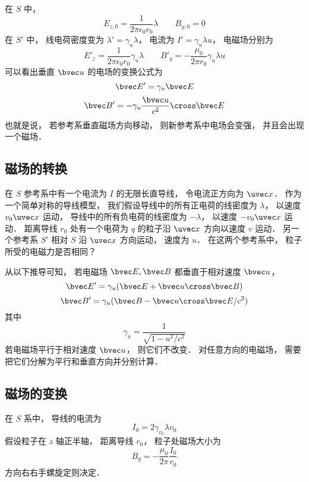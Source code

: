 在 $S$ 中，
\begin{equation}
E_{z,0} = \frac{1}{2\pi\epsilon_0 r_0} \lambda
\qquad
B_{y,0} = 0
\end{equation}
在 $S'$ 中， 线电荷密度变为 $\lambda' = \gamma_u \lambda$， 电流为 $I' = \gamma_u \lambda u$， 电磁场分别为
\begin{equation}
E'_z = \frac{1}{2\pi\epsilon_0 r_0} \gamma_u \lambda
\qquad
B'_y = -\frac{\mu_0}{2\pi r_0}\gamma_u \lambda u
\end{equation}
可以看出垂直 $\bvec u$ 的电场的变换公式为
\begin{equation}\label{EMRef_eq5}
\bvec E' = \gamma_u \bvec E
\end{equation}
\begin{equation}\label{EMRef_eq6}
\bvec B' = -\gamma_u \frac{\bvec u}{c^2} \cross \bvec E
\end{equation}
也就是说， 若参考系垂直磁场方向移动， 则新参考系中电场会变强， 并且会出现一个磁场．

\subsection{磁场的转换}
在 $S$ 参考系中有一个电流为 $I$ 的无限长直导线， 令电流正方向为 $\uvec x$． 作为一个简单对称的导线模型， 我们假设导线中的所有正电荷的线密度为 $\lambda$， 以速度 $v_0\uvec x$ 运动， 导线中的所有负电荷的线密度为 $-\lambda$，  以速度 $-v_0\uvec x$ 运动． 距离导线 $r_0$ 处有一个电荷为 $q$ 的粒子沿 $\uvec x$ 方向以速度 $v$ 运动． 另一个参考系 $S'$ 相对 $S$ 沿 $\uvec x$ 方向运动， 速度为 $u$． 在这两个参考系中， 粒子所受的电磁力是否相同？

从以下推导可知， 若电磁场 $\bvec E, \bvec B$ 都垂直于相对速度 $\bvec u$，%
\begin{equation}\label{EMRef_eq1}
\bvec E' = \gamma_u (\bvec E + \bvec u \cross \bvec B)
\end{equation}
\begin{equation}\label{EMRef_eq2}
\bvec B' = \gamma_u (\bvec B - \bvec u \cross \bvec E/c^2)
\end{equation}
其中
\begin{equation}
\gamma_u = \frac{1}{\sqrt{1 - u^2/c^2}}
\end{equation}
若电磁场平行于相对速度 $\bvec u$， 则它们不改变． 对任意方向的电磁场， 需要把它们分解为平行和垂直方向并分别计算．

\subsection{磁场的变换}
在 $S$ 系中， 导线的电流为
\begin{equation}
I_0 = 2 \gamma_{v_0}\lambda v_0
\end{equation}
假设粒子在 $z$ 轴正半轴， 距离导线 $r_0$， 粒子处磁场大小为
\begin{equation}
B_y = -\frac{\mu_0}{2\pi} \frac{I_0}{r_0}
\end{equation}
方向右右手螺旋定则决定．

